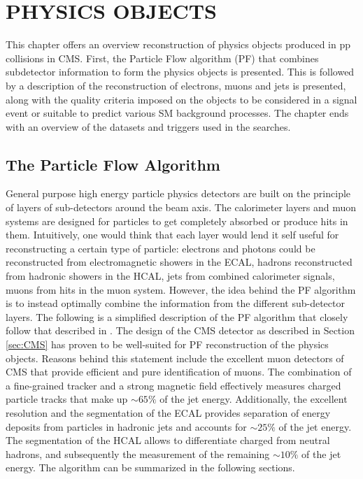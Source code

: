 \chapter{PHYSICS OBJECTS}\label{sec:objects}
\noindent\justify
This chapter offers an overview reconstruction of physics objects produced in pp collisions in CMS. 
First, the Particle Flow algorithm (PF) that combines subdetector information to form the physics objects is presented. 
This is followed by a description of the reconstruction of electrons, muons and jets is presented, along with the quality criteria imposed on the objects to be considered in a signal event or suitable to predict various SM background processes. 
The chapter ends with an overview of the datasets and triggers used in the searches.  
\newpage
\section{The Particle Flow Algorithm}\label{sec:PF}
\noindent\justify
General purpose high energy particle physics detectors are built on the principle of layers of sub-detectors around the beam axis. 
The calorimeter layers and muon systems are designed for particles to get completely absorbed or produce hits in them. 
Intuitively, one would think that each layer would lend it self useful for reconstructing a certain type of particle: electrons and photons could be reconstructed from electromagnetic showers in the ECAL, hadrons reconstructed from hadronic showers in the HCAL, jets from combined calorimeter signals, muons from hits in the muon system. 
However, the idea behind the PF algorithm is to instead optimally combine the information from the different sub-detector layers.   
The following is a simplified description of the PF algorithm that closely follow that described in \cite{Sirunyan:2017ulk}.
The design of the CMS detector as described in Section \ref{sec:CMS} has proven to be well-suited for PF reconstruction of the physics objects. 
Reasons behind this statement include the excellent muon detectors of CMS that provide efficient and pure identification of muons. 
The combination of a fine-grained tracker and a strong magnetic field effectively measures charged particle tracks that make up $\sim65\%$ of the jet energy. 
Additionally, the excellent resolution and the segmentation of the ECAL provides separation of energy deposits from particles in hadronic jets and accounts for $\sim25\%$ of the jet energy. 
The segmentation of the HCAL allows to differentiate charged from neutral hadrons, and subsequently the measurement of the remaining $\sim10\%$ of the jet energy. 
The algorithm can be summarized in the following sections.
